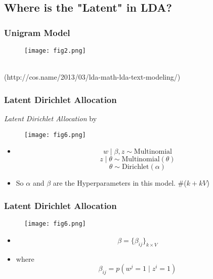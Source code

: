 \documentclass{beamer}
\begin{document}
\subsection{Where is the "Latent" in LDA?}
\begin{frame}
\frametitle{Unigram Model}
\begin{figure}
\texttt{[image: fig2.png]}
\end{figure}
\\
 (http://cos.name/2013/03/lda-math-lda-text-modeling/)
\end{frame}


\begin{frame}
\frametitle{Latent Dirichlet Allocation}
{\em Latent Dirichlet Allocation} by \cite{p1}
\begin{figure}
\texttt{[image: fig6.png]}\\
\footnotesize{}
\end{figure}
\begin{itemize}
\item $$w \mid \beta, z \sim \text{Multinomial} $$
$$z \mid \theta \sim \text{Multinomial}(\theta)$$
$$\theta \sim \text{Dirichlet}(\alpha)$$
\item So $\alpha$ and $\beta$ are the Hyperparameters in this model. \#($k + kV$)
\end{itemize}
\end{frame}

\begin{frame}
\frametitle{Latent Dirichlet Allocation}
\begin{figure}
\texttt{[image: fig6.png]}\\
\footnotesize{}
\end{figure}
\begin{itemize}
\item $$\beta = \{\beta_{ij}\}_{k \times V}$$
\item where $${\beta_{ij}} = p(w^{j} = 1 \mid z^i = 1)$$
\end{itemize}
\end{frame}
\end{document}
